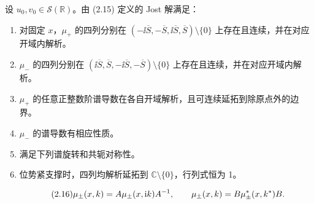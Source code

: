 \begin{paperpropositioncn*}
设 $u_0,v_0\in\mathcal S(\mathbb R)$。由 (2.15) 定义的 Jost 解满足：
\begin{enumerate}[label=\alph*.]
\item 对固定 $x$，$\mu_+$ 的四列分别在 $(-\ii\overline S,-\overline S,\ii\overline S,\overline S)\setminus\{0\}$ 上存在且连续，并在对应开域内解析。
\item $\mu_-$ 的四列分别在 $(\ii\overline S,\overline S,-\ii\overline S,-\overline S)\setminus\{0\}$ 上存在且连续，并在对应开域内解析。
\item $\mu_+$ 的任意正整数阶谱导数在各自开域解析，且可连续延拓到除原点外的边界。
\item $\mu_-$ 的谱导数有相应性质。
\item 满足下列谱旋转和共轭对称性。
\item 位势紧支撑时，四列均解析延拓到 $\mathbb C\setminus\{0\}$，行列式恒为 1。
\end{enumerate}
\end{paperpropositioncn*}
\begin{equation}
\originaleq{2.16}
\mu_\pm(x,k)=A\mu_\pm(x,\ii k)A^{-1},\qquad
\mu_\pm(x,k)=B\mu_\pm^*(x,k^*)B.
\end{equation}
